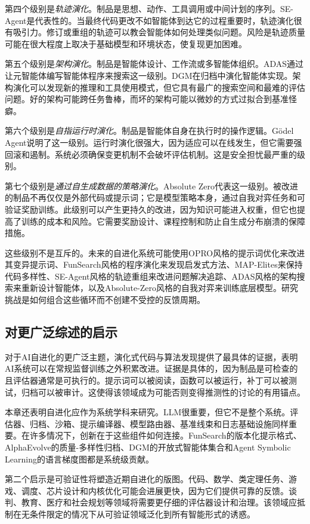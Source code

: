第四个级别是\emph{轨迹演化}。制品是思想、动作、工具调用或中间计划的序列。SE-Agent是代表性的。当最终代码更改不如智能体到达它的过程重要时，轨迹演化很有吸引力。修订或重组的轨迹可以教会智能体如何处理类似问题。风险是轨迹质量可能在很大程度上取决于基础模型和环境状态，使复现更加困难。

第五个级别是\emph{架构演化}。制品是智能体设计、工作流或多智能体组织。ADAS通过让元智能体编写智能体程序来搜索这一级别。DGM在归档中演化智能体实现。架构演化可以发现新的推理和工具使用模式，但它具有最广的搜索空间和最难的评估问题。好的架构可能跨任务鲁棒，而坏的架构可能以微妙的方式过拟合到基准怪癖。

第六个级别是\emph{自指运行时演化}。制品是智能体自身在执行时的操作逻辑。G{\"o}del Agent说明了这一级别。运行时演化很强大，因为适应可以在线发生，但它需要强回滚和遏制。系统必须确保变更机制不会破坏评估机制。这是安全担忧最严重的级别。

第七个级别是\emph{通过自生成数据的策略演化}。Absolute Zero代表这一级别。被改进的制品不再仅仅是外部代码或提示词；它是模型策略本身，通过自我对弈任务和可验证奖励训练。此级别可以产生更持久的改进，因为知识可能进入权重，但它也提高了训练的成本和风险。它需要奖励设计、课程控制和防止自生成分布崩溃的保障措施。

这些级别不是互斥的。未来的自进化系统可能使用OPRO风格的提示词优化来改进其变异提示词、FunSearch风格的程序演化来发现启发式方法、MAP-Elites来保持代码多样性、SE-Agent风格的轨迹重组来改进问题解决追踪、ADAS风格的架构搜索来重新设计智能体，以及Absolute-Zero风格的自我对弈来训练底层模型。研究挑战是如何组合这些循环而不创建不受控的反馈周期。

\subsection{对更广泛综述的启示}
\label{subsec:evolution-implications-survey}

对于AI自进化的更广泛主题，演化式代码与算法发现提供了最具体的证据，表明AI系统可以在常规监督训练之外积累改进。证据是具体的，因为制品是可检查的且评估器通常是可执行的。提示词可以被阅读，函数可以被运行，补丁可以被测试，归档可以被审计。这使得该领域成为可能否则变得推测性的讨论的有用锚点。

本章还表明自进化应作为系统学科来研究。LLM很重要，但它不是整个系统。评估器、归档、沙箱、提示编译器、模型路由器、基准线束和日志基础设施同样重要。在许多情况下，创新在于这些组件如何连接。FunSearch的版本化提示格式、AlphaEvolve的质量-多样性归档、DGM的开放式智能体集合和Agent Symbolic Learning的语言梯度图都是系统级贡献。

第二个启示是可验证性将塑造近期自进化的版图。代码、数学、类定理任务、游戏、调度、芯片设计和内核优化可能会进展更快，因为它们提供可靠的反馈。谈判、教育、医疗和社会规划等领域将需要更仔细的评估器设计和治理。该领域应抵制在无条件限定的情况下从可验证领域泛化到所有智能形式的诱惑。

